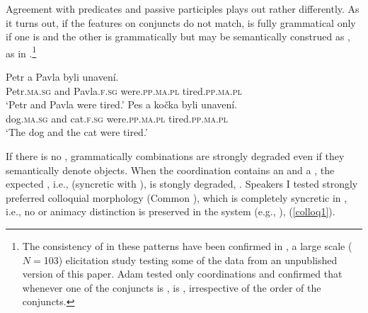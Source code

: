 \documentclass[output=paper,modfontsnewtxmath,hidelinks]{langscibook}
\begin{document}
Agreement with  predicates and passive participles plays out rather differently. As it turns out, if the  features on conjuncts do not match,  is fully grammatical only if one  is   and the other  is grammatically  but may be semantically construed as , as in .\footnote{The consistency of    in these patterns have been confirmed in \citet{Adam:2017}, a large scale ($N={}$103) elicitation study testing some of the data from an unpublished version of this paper. Adam tested only  coordinations and confirmed that whenever one of the conjuncts is  ,  is  , irrespective of the order of the conjuncts.}


\ea\label{anim-2}
\ea\gll Petr a Pavla byli unavení.\\
Petr.\textsc{ma.sg} and Pavla.\textsc{f.sg} were.\textsc{pp.ma.pl} tired.\textsc{pp.ma.pl}\\
\glt `Petr and Pavla were tired.'\smallskip
\ex\gll  Pes a kočka byli unavení.\\
dog.\textsc{ma.sg} and cat.\textsc{f.sg} were.\textsc{pp.ma.pl} tired.\textsc{pp.ma.pl}\\
\glt `The dog and the cat were tired.'\\
\z
\hfill {}
\z

\noindent If there is no   , grammatically   combinations are strongly degraded even if they semantically denote  objects. When the coordination contains an    and a , the expected , i.e.,   (syncretic with  ), is stongly degraded, . Speakers I tested strongly preferred colloquial morphology (Common ), which is completely syncretic in , i.e., no  or animacy distinction is preserved in the system (e.g., \citealt[76]{KarlikEtAl:2002}), (\ref{colloq1}).

\z
\end{document}
